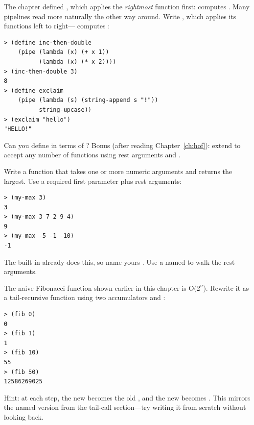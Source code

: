 \begin{exercise}
The chapter defined , which applies the \emph{rightmost} function first:  computes . Many pipelines read more naturally the other way around. Write , which applies its functions left to right--- computes :

\begin{lstlisting}[style=repl]
> (define inc-then-double
    (pipe (lambda (x) (+ x 1))
          (lambda (x) (* x 2))))
> (inc-then-double 3)
8
> (define exclaim
    (pipe (lambda (s) (string-append s "!"))
          string-upcase))
> (exclaim "hello")
"HELLO!"
\end{lstlisting}

Can you define  in terms of ? Bonus (after reading Chapter~\ref{ch:hof}): extend  to accept any number of functions using rest arguments and .
\end{exercise}

\begin{exercise}
Write a function  that takes one or more numeric arguments and returns the largest. Use a required first parameter plus rest arguments:

\begin{lstlisting}[style=repl]
> (my-max 3)
3
> (my-max 3 7 2 9 4)
9
> (my-max -5 -1 -10)
-1
\end{lstlisting}

The built-in  already does this, so name yours . Use a named  to walk the rest arguments.
\end{exercise}

\begin{exercise}
The naive Fibonacci function shown earlier in this chapter is O($2^n$). Rewrite it as a tail-recursive function using two accumulators  and :

\begin{lstlisting}[style=repl]
> (fib 0)
0
> (fib 1)
1
> (fib 10)
55
> (fib 50)
12586269025
\end{lstlisting}

Hint: at each step, the new  becomes the old , and the new  becomes . This mirrors the named  version from the tail-call section---try writing it from scratch without looking back.
\end{exercise}


